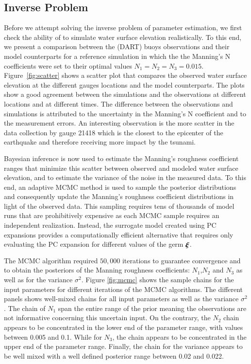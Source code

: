\subsection{Inverse Problem} 
\label{sec:inverse}

Before we attempt solving the inverse problem of parameter estimation, 
we first check the ability of \geoclaw to simulate water surface elevation
realistically. To this end, we present a comparison between the 
(DART) buoys observations  and their \geoclaw model counterparts
for a reference simulation in which the  the Manning's N coefficients were set to their optimal values $N_1=N_2=N_3=0.015$. Figure~\ref{fig:scatter} 
shows a scatter plot that compares the observed 
water surface elevation at the different gauges locations and the  \geoclaw model counterparts. 
The plots show a good agreement between the simulations and the 
observations at different locations and at different times. 
The difference between the observations and simulations is attributed to the uncertainty in the 
Manning's N coefficient and to the measurement errors.
\alert{An interesting observation is the more scatter in the data collection by gauge 21418 which is the closest to
the epicenter of the earthquake and therefore receiving more impact by the tsunami.}

Bayesian inference is now used to estimate the Manning's 
roughness coefficient ranges that minimize this scatter between 
observed and modeled water surface elevation, and to estimate the variance of the noise in the measured data.
To this end, an adaptive MCMC method is used to sample 
the posterior distributions \citep{Gareth2009,Haario2001} and consequently 
update the Manning's roughness coefficient distributions in light of the 
observed data. This sampling requires tens of thousands of 
\geoclaw model runs that are prohibitively expensive as each MCMC 
sample requires an independent \geoclaw realization. Instead,
the surrogate model created using PC expansions provides a computationally
efficient alternative that requires only evaluating the PC expansion
for different values of the germ $\xxi$.

The MCMC algorithm required $50,000$ iterations to guarantee convergence
and to obtain the posteriors of the Manning roughness coefficients: 
$N_1$,$N_2$ and $N_3$ as well as for the variance $\sigma^2$. Figure \ref{fig:mcmc} 
shows the sample chains for the input parameters for different iterations of the MCMC algorithms. 
The different panels shows well-mixed chains for all input parameters as well as the variance $\sigma^2$.
The chain of  $N_{1}$ span the entire range of the prior meaning the observations are not informative 
concerning this uncertain input.  On the contrary, the $N_{2}$ chain appears to be concentrated in the 
lower end of the parameter range, with values between 0.005 and 0.1. 
While for $N_{3}$, the chain appears to be concentrated in the 
upper end of the parameter range. Finally, the chain for the variance 
appears to be well mixed with a well defined posterior range between 0.02 and 0.022.


